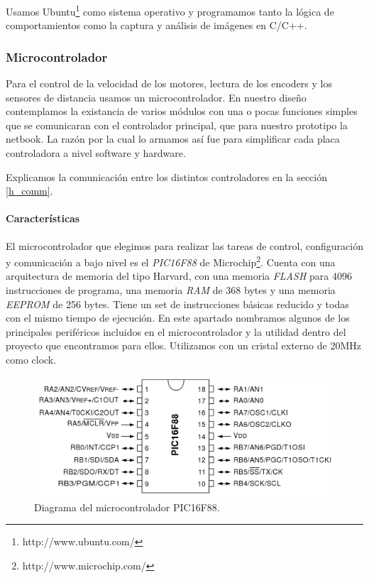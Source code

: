 Usamos Ubuntu\footnote{http://www.ubuntu.com/} como sistema operativo y programamos tanto la l\'ogica de comportamientos
como la captura y an\'alisis de im\'agenes en C/C++.

\subsubsection{Microcontrolador}
\label{h_controlador_micro}

Para el control de la velocidad de los motores, lectura de los encoders y los sensores de distancia usamos un
microcontrolador.
En nuestro dise\~no contemplamos la existancia de varios m\'odulos con una o pocas funciones simples que se comunicaran
con el controlador principal, que para nuestro prototipo la netbook.
La raz\'on por la cual lo armamos as\'i fue para simplificar cada placa controladora a nivel software y hardware.

Explicamos la comunicaci\'on entre los distintos controladores en la secci\'on \ref{h_comm}.

\paragraph{Caracter\'isticas}
\label{h_controlador_micro_caracteristicas}

El microcontrolador que elegimos para realizar las tareas de control, configuraci\'on y comunicaci\'on a bajo nivel
es el \emph{PIC16F88} de Microchip\footnote{http://www.microchip.com/}.
Cuenta con una arquitectura de memoria del tipo Harvard, con una memoria \emph{FLASH} para 4096 instrucciones de
programa, una memoria \emph{RAM} de 368 bytes y una memoria \emph{EEPROM} de 256 bytes.
Tiene un set de instrucciones b\'asicas reducido y todas con el mismo tiempo de ejecuci\'on.
En este apartado nombramos algunos de los principales perif\'ericos incluidos en el microcontrolador y la utilidad
dentro del proyecto que encontramos para ellos.
Utilizamos con un cristal externo de 20MHz como clock.

\begin{figure}[h]
	\centering
	\includegraphics[scale=0.20]{figuras/pic16f88.png}
	\caption{Diagrama del microcontrolador PIC16F88.}
	\label{hF_pic16f88_diagrama}
\end{figure}

